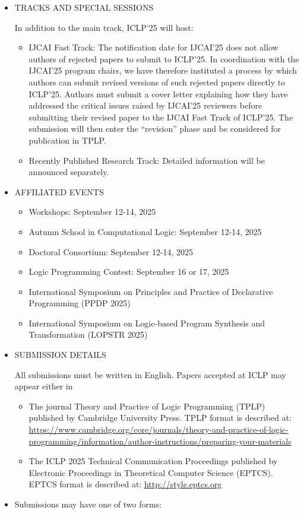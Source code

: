 \documentclass[prodmode,acmtecs]{acmsmall} %
\begin{document}
\begin{itemize}
\item  TRACKS AND SPECIAL SESSIONS 
 
  In addition to the main track, ICLP’25 will host: 
 
\begin{itemize}\item  IJCAI Fast Track: The notification date for IJCAI’25 does not allow authors of rejected papers to submit to ICLP’25. In coordination with the IJCAI’25 program chairs, we have therefore instituted a process by which authors can submit revised versions of such rejected papers directly to ICLP’25. Authors must submit a cover letter explaining how they have addressed the critical issues raised by IJCAI’25 reviewers before submitting their revised paper to the IJCAI Fast Track of ICLP’25. The submission will then enter the “revision” phase and be considered for publication in TPLP. 
\item  Recently Published Research Track: Detailed information will be announced separately.
\end{itemize} 
\item  AFFILIATED EVENTS 
 
\begin{itemize}\item  Workshops: September 12-14, 2025
\item  Autumn School in Computational Logic: September 12-14, 2025
\item  Doctoral Consortium: September 12-14, 2025
\item  Logic Programming Contest: September 16 or 17, 2025 
\item  International Symposium on Principles and Practice of Declarative Programming (PPDP 2025)
\item  International Symposium on Logic-based Program Synthesis and Transformation (LOPSTR 2025)
\end{itemize} 
\item  SUBMISSION DETAILS 
 
  All submissions must be written in English. Papers accepted at ICLP may appear either in 
 
\begin{itemize}\item    The journal Theory and Practice of Logic Programming (TPLP) published by Cambridge University Press. TPLP format is described at: \href{https://www.cambridge.org/core/journals/theory-and-practice-of-logic-programming/information/author-instructions/preparing-your-materials}{https://www.cambridge.org/core/journals/theory-and-practice-of-logic-programming/information/author-instructions/preparing-your-materials}
\item    The ICLP 2025 Technical Communication Proceedings published by Electronic Proceedings in Theoretical Computer Science (EPTCS). EPTCS format is described at: \href{http://style.eptcs.org}{http://style.eptcs.org}
\end{itemize} 
\item  Submissions may have one of two forms: 
 

\end{itemize}
\end{document}
